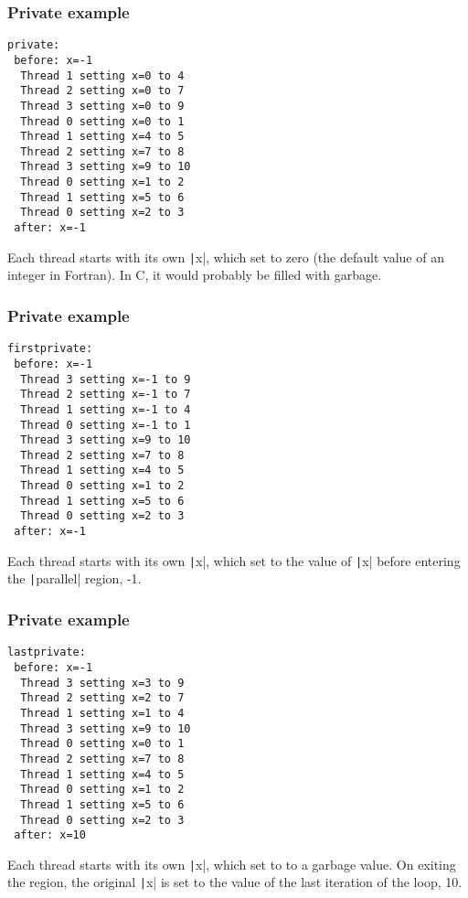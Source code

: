 \documentclass{beamer}
\begin{document}
\begin{frame}[fragile]
\frametitle{Private example}
\begin{verbatim}
private:
 before: x=-1
  Thread 1 setting x=0 to 4
  Thread 2 setting x=0 to 7
  Thread 3 setting x=0 to 9
  Thread 0 setting x=0 to 1
  Thread 1 setting x=4 to 5
  Thread 2 setting x=7 to 8
  Thread 3 setting x=9 to 10
  Thread 0 setting x=1 to 2
  Thread 1 setting x=5 to 6
  Thread 0 setting x=2 to 3
 after: x=-1
\end{verbatim}
Each thread starts with its own \texttt|x|, which set to zero (the default value of an integer in Fortran).
In C, it would probably be filled with garbage.
\end{frame}

\begin{frame}[fragile]
\frametitle{Private example}
\begin{verbatim}
firstprivate:
 before: x=-1
  Thread 3 setting x=-1 to 9
  Thread 2 setting x=-1 to 7
  Thread 1 setting x=-1 to 4
  Thread 0 setting x=-1 to 1
  Thread 3 setting x=9 to 10
  Thread 2 setting x=7 to 8
  Thread 1 setting x=4 to 5
  Thread 0 setting x=1 to 2
  Thread 1 setting x=5 to 6
  Thread 0 setting x=2 to 3
 after: x=-1
\end{verbatim}
Each thread starts with its own \texttt|x|, which set to the value of \texttt|x| before entering the \texttt|parallel| region, -1.
\end{frame}

\begin{frame}[fragile]
\frametitle{Private example}
\begin{verbatim}
lastprivate:
 before: x=-1
  Thread 3 setting x=3 to 9
  Thread 2 setting x=2 to 7
  Thread 1 setting x=1 to 4
  Thread 3 setting x=9 to 10
  Thread 0 setting x=0 to 1
  Thread 2 setting x=7 to 8
  Thread 1 setting x=4 to 5
  Thread 0 setting x=1 to 2
  Thread 1 setting x=5 to 6
  Thread 0 setting x=2 to 3
 after: x=10
\end{verbatim}
Each thread starts with its own \texttt|x|, which set to to a garbage value.
On exiting the region, the original \texttt|x| is set to the value of the last iteration of the loop, 10.
\end{frame}
\end{document}
